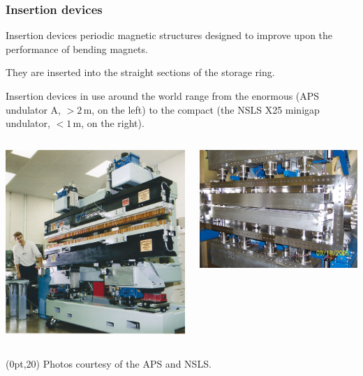 \documentclass[10pt, xcolor=x11names, compress]{beamer}
\begin{document}
\begin{frame}
  \frametitle{Insertion devices}

  Insertion devices periodic magnetic structures designed to improve
  upon the performance of bending magnets.

  \smallskip

  They are \alert{inserted into} the straight sections of the storage
  ring.

  \smallskip

  Insertion devices in use around the world range from the enormous
  (APS undulator A, $>2$\,m, on the left) to the compact (the NSLS X25
  minigap undulator, $<1$\,m, on the right).

  \begin{columns}
    \begin{column}{0.5\linewidth}
      \begin{center}
        \includegraphics[width=0.7\linewidth]{synch/APSundulatorA.jpg}
      \end{center}
    \end{column}
    \begin{column}{0.5\linewidth}
      \begin{center}
        \includegraphics[width=0.7\linewidth]{synch/x25mgu.jpg}
      \end{center}
    \end{column}
  \end{columns}
  \begin{textblock*}{0.5\linewidth}(0pt,20\TPVertModule)%
    \tiny%
    Photos courtesy of the APS and NSLS.
  \end{textblock*}
\end{frame}
\end{document}
